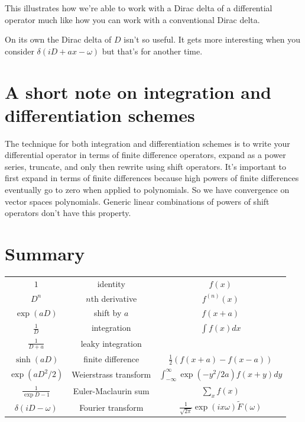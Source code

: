 \documentclass[a4paper]{article}
\theoremstyle{definition}
\begin{document}
This illustrates how we're able to work with a Dirac delta of a differential operator much like how you can work with a conventional Dirac delta.

On its own the Dirac delta of $D$ isn't so useful.
It gets more interesting when you consider $\delta(iD+ax-\omega)$ but that's for another time.


%

\section{A short note on integration and differentiation schemes}
The technique for both integration and differentiation schemes is to write your differential operator in terms of finite difference operators, expand as a power series, truncate, and only then rewrite using shift operators.
It's important to first expand in terms of finite differences because high powers of finite differences eventually go to zero when applied to polynomials.
So we have convergence on vector spaces polynomials.
Generic linear combinations of powers of shift operators don't have this property.

\section{Summary}
\begin{center}
\tabulinesep=1.2mm
\begin{tabu}{|c|c|c|}
\hline
$1$ & identity & $f(x)$ \\
$D^n$ & $n$th derivative & $f^{(n)}(x)$ \\
$\exp(aD)$ & shift by $a$ & $f(x+a)$ \\
$\frac{1}{D}$ & integration & $\int f(x)dx$ \\
$\frac{1}{D+a}$ & leaky integration & \\
$\sinh(aD)$ & finite difference & $\frac{1}{2}(f(x+a)-f(x-a))$ \\
$\exp(aD^2/2)$ & Weierstrass transform & $\int_{-\infty}^\infty \exp(-y^2/2a) f(x+y)dy$ \\
$\frac{1}{\exp D-1}$ & Euler-Maclaurin sum & $\sum_x f(x)$ \\
$\delta(iD-\omega)$ & Fourier transform & $\frac{1}{\sqrt{2\pi}}\exp(ix\omega)\tilde{F}(\omega)$ \\
\hline
\end{tabu}
\end{center}
\end{document}
